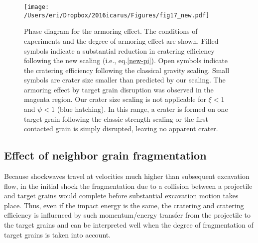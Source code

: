 \documentclass[3p,authoryear]{elsarticle}
\begin{document}
\begin{figure}
	\centering
	\texttt{[image: /Users/eri/Dropbox/2016icarus/Figures/fig17\_new.pdf]}
	\caption{Phase diagram for the armoring effect. The conditions of experiments and the degree of armoring effect are shown. Filled symbols indicate a substantial reduction in cratering efficiency following the new scaling (i.e., eq.\eqref{new-pi}). Open symbols indicate the cratering efficiency following the classical gravity scaling. Small symbols are crater size smaller than predicted by our scaling. The armoring effect by target grain disruption was observed in the magenta region. Our crater size scaling is not applicable for $\xi<1$ and $\psi<1$ (blue hatching). In this range, a crater is formed on one target grain following the classic strength scaling or the first contacted grain is simply disrupted, leaving no apparent crater.}
	\label{psi-xi}
	\centering
\end{figure}

\subsection{Effect of neighbor grain fragmentation}\label{sec:mechanism}
Because shockwaves travel at velocities much higher than subsequent excavation flow, in the initial shock the fragmentation due to a collision between a projectile and target grains would complete before substantial excavation motion takes place. Thus, even if the impact energy is the same, the cratering and cratering efficiency is influenced by such momentum/energy transfer from the projectile to the target grains and can be interpreted well when the degree of fragmentation of target grains is taken into account.
\end{document}
